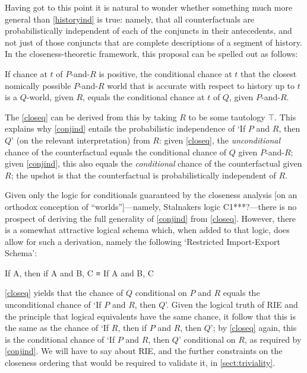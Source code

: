 \documentclass[If.tex]{subfiles}
\begin{document}
Having got to this point it is natural to wonder whether something much more general than \ref{historyind} is true: namely, that all counterfactuals are probabilistically independent of each of the conjuncts in their antecedents, and not just of those conjuncts that are complete descriptions of a segment of history.  In the closeness-theoretic framework, this proposal can be spelled out as follows:
\begin{prop}
	 \label{conjind}
	If chance at $t$ of $P$-and-$R$ is positive, the conditional chance at $t$ that the closest nomically possible $P$-and-$R$ world that is accurate with respect to history up to $t$ is a $Q$-world, given $R$, equals the conditional chance at $t$ of $Q$, given $P$-and-$R$.	
\end{prop}
The \ref{closeq} can be derived from this by taking $R$ to be some tautology $\top$.  This explains why \ref{conjind} entails the probabilistic independence of ‘If $P$ and $R$, then $Q$’ (on the relevant interpretation) from $R$: given \ref{closeq}, the \emph{unconditional} chance of the counterfactual equals the conditional chance of $Q$ given $P$-and-$R$; given \ref{conjind}, this also equals the \emph{conditional} chance of the counterfactual given $R$; the upshot is that the counterfactual is probabilistically independent of $R$.  

Given only the logic for conditionals guaranteed by the closeness analysis [on an orthodox conception of “worlds”]---namely, Stalnakers logic C1***?---there is no prospect of deriving the full generality of \ref{conjind} from \ref{closeq}.  However, there is a somewhat attractive logical schema which, when added to that logic, does allow for such a derivation, namely the following ‘Restricted Import-Export Schema’:
\begin{prop}
	\sitem[RIE]
	If A, then if A and B, C ≡ If A and B, C 
\end{prop}
\ref{closeq} yields that the chance of $Q$ conditional on $P$ and $R$ equals the unconditional chance of ‘If $P$ and $R$, then $Q$’.  Given the logical truth of RIE and the principle that logical equivalents have the same chance, it follow that this is the same as the chance of ‘If $R$, then if $P$ and $R$, then $Q$’; by \ref{closeq} again, this is the conditional chance of ‘If $P$ and $R$, then $Q$’ conditional on $R$, as required by \ref{conjind}.  We will have to say about RIE, and the further constraints on the closeness ordering that would be required to validate it, in \autoref{sect:triviality}.
\end{document}
